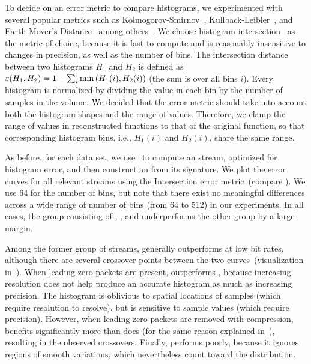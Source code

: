 To decide on an error metric to compare histograms, we experimented with several popular metrics
such as Kolmogorov-Smirnov~\cite{smirnov1948}, Kullback-Leibler~\cite{kullback1951}, and Earth
Mover's Distance~\cite{emd1998} among others~\cite{Hellinger1909,Bhattacharyya1943}. We choose
histogram intersection~\cite{histogram_intersection1991} as the metric of choice, because it is fast
to compute and is reasonably insensitive to changes in precision, as well as the number of bins. The
intersection distance between two histograms $H_1$ and $H_2$ is defined as
$\err(H_1,H_2)=1-\sum_{i}{\min{(H_1(i),H_2(i))}}$ (the sum is over all bins $i$). Every histogram is
normalized by dividing the value in each bin by the number of samples in the volume. We decided that
the error metric should take into account both the histogram shapes and the range of values.
Therefore, we clamp the range of values in reconstructed functions to that of the original function,
so that corresponding histogram bins, i.e., $H_1(i)$ and $H_2(i)$, share the same range.

As before, for each data set, we use~ to compute an \shop stream, optimized for
histogram error, and then construct an \shsg from its signature. We plot the error curves for all
relevant streams using the Intersection error metric~(compare
). We use 64 for the number of bins, but note that there exist
no meaningful differences across a wide range of number of bins (from 64 to 512) in our experiments.
In all cases, the group consisting of \sbit, \slvl, and \smag underperforms the other group by a
large margin.

Among the former group of streams, \slvl generally outperforms \sbit at low bit rates, although
there are several crossover points between the two curves~(visualization
in~). When leading zero packets are present, \slvl outperforms \sbit,
because increasing resolution does not help produce an accurate histogram as much as increasing
precision. The histogram is oblivious to spatial locations of samples (which require resolution to
resolve), but is sensitive to sample values (which require precision). However, when leading zero
packets are removed with compression, \sbit benefits significantly more than \slvl does (for the
same reason explained in~), resulting in the observed crossovers. Finally,
\smag performs poorly, because it ignores regions of smooth variations, which nevertheless count
toward the distribution.

